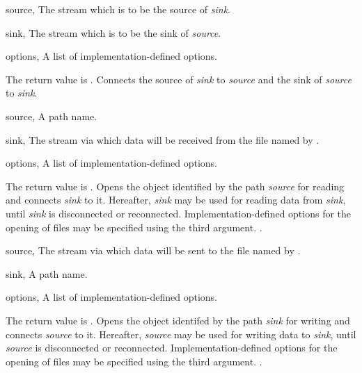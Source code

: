 \begin{optDefinition}
\begin{specargs}
    \item[source, \classref{stream}] The stream which is to be the source of
    {\em sink}.
    \item[sink, \classref{stream}] The stream which is to be the sink of {\em
        source}.
    \item[options, \classref{list}] A list of implementation-defined options.
\end{specargs}
%
\result%
The return value is \nil{}.
%
\remarks%
Connects the source of {\em sink\/} to {\em source\/} and the sink of
{\em source\/} to {\em sink}.

\begin{specargs}
    \item[source, \theclass{path}] A path name.
    \item[sink, \classref{file-stream}] The stream via which data will be
    received from the file named by .
    \item[options, \classref{list}] A list of implementation-defined options.
\end{specargs}
%
\result%
The return value is \nil{}.
%
\remarks%
Opens the object identified by the path {\em source\/} for reading and
connects {\em sink\/} to it. Hereafter, {\em sink\/} may be used for reading
data from {\em sink\/}, until {\em sink\/} is disconnected or
reconnected. Implementation-defined options for the opening of files may be
specified using the third argument.
%
\seealso%
.

\begin{specargs}
    \item[source, \classref{file-stream}] The stream via which data will be sent
    to the file named by .
    \item[sink, \theclass{path}] A path name.
    \item[options, \classref{list}] A list of implementation-defined options.
\end{specargs}
%
\result%
The return value is \nil{}.
%
\remarks%
Opens the object identifed by the path {\em sink\/} for writing and
connects {\em source\/} to it. Hereafter, {\em source\/} may be used for writing
data to {\em sink}, until {\em source\/} is disconnected or
reconnected. Implementation-defined options for the opening of files may be
specified using the third argument.
%
\seealso%
.


\end{optDefinition}
